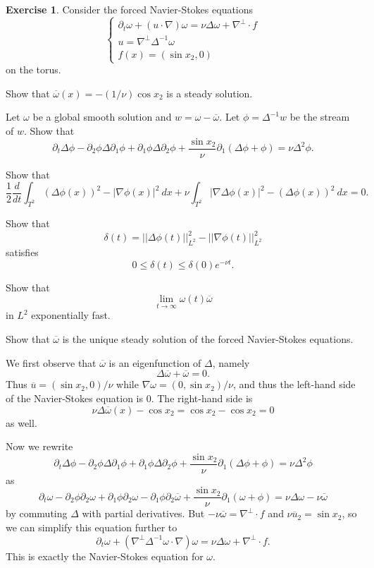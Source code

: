 \documentclass[10pt]{article}
\theoremstyle{definition}
\newtheorem{exer}{Exercise}
\begin{document}
\begin{exer}
Consider the forced Navier-Stokes equations
$$\begin{cases}
\partial_t \omega + (u \cdot \nabla)\omega = \nu \Delta \omega + \nabla^\perp \cdot f\\
u = \nabla^\perp \Delta^{-1}\omega\\
f(x) = (\sin x_2, 0)\end{cases}$$
on the torus.

Show that $\overline \omega(x) = -(1/\nu)\cos x_2$ is a steady solution.

Let $\omega$ be a global smooth solution and $w = \omega - \overline \omega$.
Let $\phi = \Delta^{-1}w$ be the stream of $w$.
Show that
$$\partial_t \Delta \phi - \partial_2 \phi \Delta \partial_1 \phi + \partial_1 \phi \Delta \partial_2 \phi + \frac{\sin x_2}{\nu}\partial_1(\Delta \phi+\phi) = \nu \Delta^2\phi.$$

Show that
\begin{equation}
\label{energy balance}
\frac{1}{2} \frac{d}{dt} \int_{T^2} (\Delta \phi(x))^2 - |\nabla \phi(x)|^2 ~dx + \nu \int_{T^2} |\nabla \Delta \phi(x)|^2 - (\Delta \phi(x))^2 ~dx = 0.
\end{equation}

Show that
$$\delta(t) = ||\Delta \phi(t)||_{L^2}^2 - ||\nabla \phi(t)||_{L^2}^2$$
satisfies
$$0 \leq \delta(t) \leq \delta(0) e^{-\nu t}.$$

Show that
$$\lim_{t \to \infty} \omega(t) \overline \omega$$
in $L^2$ exponentially fast.

Show that $\overline \omega$ is the unique steady solution of the forced Navier-Stokes equations.
\end{exer}

We first observe that $\overline \omega$ is an eigenfunction of $\Delta$, namely
$$\Delta \overline \omega + \overline \omega = 0.$$
Thus $\overline u = (\sin x_2, 0)/\nu$ while $\nabla \omega = (0, \sin x_2)/\nu$, and thus the left-hand side of the Navier-Stokes equation is $0$.
The right-hand side is
$$\nu \Delta \overline \omega(x) - \cos x_2 = \cos x_2 - \cos x_2 = 0$$
as well.

Now we rewrite
$$\partial_t \Delta \phi - \partial_2 \phi \Delta \partial_1 \phi + \partial_1 \phi \Delta \partial_2 \phi + \frac{\sin x_2}{\nu}\partial_1(\Delta \phi+\phi) = \nu \Delta^2\phi$$
as
$$\partial_t \omega - \partial_2 \phi \partial_2 \omega + \partial_1 \phi \partial_2 \omega - \partial_1 \phi \partial_2 \overline \omega + \frac{\sin x_2}{\nu} \partial_1(\omega + \phi) = \nu \Delta \omega - \nu \overline \omega$$
by commuting $\Delta$ with partial derivatives.
But $-\nu \overline \omega = \nabla^\perp \cdot f$ and $\nu \overline u_2 = \sin x_2$, so we can simplify this equation further to
$$\partial_t \omega + (\nabla^\perp \Delta^{-1}\omega \cdot \nabla)\omega = \nu \Delta \omega + \nabla^\perp \cdot f.$$
This is exactly the Navier-Stokes equation for $\omega$.
\end{document}
